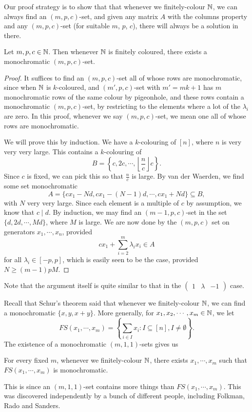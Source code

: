 \documentclass[a4paper]{article}
\begin{document}
  Our proof strategy is to show that that whenever we finitely-colour $\mathbb{N}$, we can always find an $(m, p, c)$-set, and given any matrix $A$ with the columns property and any $(m, p, c)$-set (for suitable $m$, $p$, $c$), there will always be a solution in there.

  \begin{prop}
    Let $m, p, c \in \mathbb{N}$. Then whenever $\mathbb{N}$ is finitely coloured, there exists a monochromatic $(m, p, c)$-set.
  \end{prop}

  \begin{proof}
    It suffices to find an $(m, p, c)$-set all of whose rows are monochromatic, since when $\mathbb{N}$ is $k$-coloured, and $(m', p, c)$-set with $m' = mk + 1$ has $m$ monochromatic rows of the same colour by pigeonhole, and these rows contain a monochromatic $(m, p, c)$-set, by restricting to the elements where a lot of the $\lambda_i$ are zero. In this proof, whenever we say $(m, p, c)$-set, we mean one all of whose rows are monochromatic.

    We will prove this by induction. We have a $k$-colouring of $[n]$, where $n$ is very very very large. This contains a $k$-colouring of
    \[
      B = \left\{c, 2c, \cdots, \left\lfloor \frac{n}{c}\right\rfloor c\right\}.
    \]
    Since $c$ is fixed, we can pick this so that $\frac{n}{c}$ is large. By van der Waerden, we find some set monochromatic
    \[
      A = \{c x_1 - Nd, cx_1 - (N - 1)d, \cdots, cx_1 + Nd \} \subseteq B,
    \]
    with $N$ very very large. Since each element is a multiple of $c$ by assumption, we know that $c \mid d$. By induction, we may find an $(m - 1, p, c)$-set in the set $\{d, 2d, \cdots, Md\}$, where $M$ is large. We are now done by the $(m, p, c)$ set on generators $x_1, \cdots, x_n$, provided
    \[
      c x_1 + \sum_{i = 2}^m \lambda_i x_i \in A
    \]
    for all $\lambda_i \in [-p, p]$, which is easily seen to be the case, provided $N \geq (m - 1) pM$.
  \end{proof}
  Note that the argument itself is quite similar to that in the $\begin{pmatrix}1 & \lambda & -1\end{pmatrix}$ case.

  Recall that Schur's theorem said that whenever we finitely-colour $\mathbb{N}$, we can find a monochromatic $\{x, y , x + y\}$. More generally, for $x_1, x_2, \cdots, x_m \in \mathbb{N}$, we let
  \[
    FS(x_1, \cdots, x_m) = \left\{\sum_{i \in I} x_i : I \subseteq [n], I \not= \emptyset\right\}.
  \]
  The existence of a monochromatic $(m, 1, 1)$-sets gives us
  \begin{cor}
    For every fixed $m$, whenever we finitely-colour $\mathbb{N}$, there exists $x_1, \cdots, x_m$ such that $FS(x_1, \cdots, x_m)$ is monochromatic.
  \end{cor}
  This is since an $(m, 1, 1)$-set contains more things than $FS(x_1, \cdots, x_m)$. This was discovered independently by a bunch of different people, including Folkman, Rado and Sanders.
\end{document}
